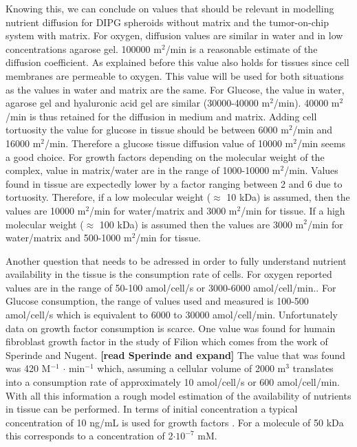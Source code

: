 \documentclass[11pt,a4paper]{article}
\begin{document}
Knowing this, we can conclude on values that should be relevant in modelling nutrient diffusion for DIPG spheroids without matrix and the tumor-on-chip system with matrix. For oxygen, diffusion values are similar in water and in low concentrations agarose gel. 100000 \textmu m$^2$/min is a reasonable estimate of the diffusion coefficient. As explained before this value also holds for tissues since cell membranes are permeable to oxygen. This value will be used for both situations as the values in water and matrix are the same. For Glucose, the value in water, agarose gel and hyaluronic acid gel are similar (30000-40000 \textmu m$^2$/min). 40000 \textmu m$^2$/min is thus retained for the diffusion in medium and matrix. Adding cell tortuosity the value for glucose in tissue should be between 6000 \textmu m$^2$/min and 16000 \textmu m$^2$/min. Therefore a glucose tissue diffusion value  of 10000 \textmu m$^2$/min seems a good choice. For growth factors depending on the molecular weight of the complex, value in matrix/water are in the range of 1000-10000 \textmu m$^2$/min. Values found in tissue are expectedly lower by a factor ranging between 2 and 6 due to tortuosity. Therefore, if a low molecular weight ($\approx$ 10 kDa) is assumed, then the values are 10000 \textmu m$^2$/min for water/matrix and 3000 \textmu m$^2$/min for tissue. If a high molecular weight ($\approx$ 100 kDa)  is assumed then the values are 3000 \textmu m$^2$/min for water/matrix and 500-1000 \textmu m$^2$/min for tissue.

Another question that needs to be adressed in order to fully understand nutrient availability in the tissue is the consumption rate of cells. For oxygen reported values are in the range of 50-100 amol/cell/s or 3000-6000 amol/cell/min.\cite{Nelson2017}\cite{Kempf2005}\cite{Mao2018}. For Glucose consumption, the range of values used and measured is 100-500 amol/cell/s which is equivalent to 6000 to 30000 amol/cell/min\cite{Mao2018}\cite{Kempf2005}\cite{Cleri2019}\cite{Jagiella2016}. Unfortunately data on growth factor consumption is scarce. One value was found for humain fibroblast growth factor in the study of Filion which comes from the work of Sperinde and Nugent.\cite{Filion2004}\cite{Sperinde2000} \textbf{[read Sperinde and expand]} The value that was found was 420 \textmu M$^{-1}$ $\cdot$ min$^{-1}$ which, assuming a cellular volume of 2000 \textmu m$^3$ translates into a consumption rate of approximately 10 amol/cell/s or 600 amol/cell/min. With all this information a rough model estimation of the availability of nutrients in tissue can be performed. In terms of initial concentration a typical concentration of 10 ng/mL is used for growth factors \cite{Meel2018}. For a molecule of 50 kDa this corresponds to a concentration of 2$\cdot 10^{-7}$ mM.
\end{document}
